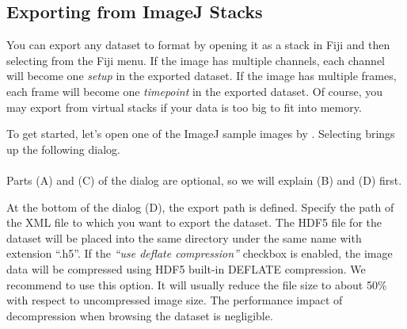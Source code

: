 \documentclass{scrartcl}
\begin{document}
%
\subsection{Exporting from ImageJ Stacks}
You can export any dataset to \bdv format by opening it as a stack in Fiji and then selecting  from the Fiji menu.
If the image has multiple channels, each channel will become one \emph{setup} in the exported dataset.
If the image has multiple frames, each frame will become one \emph{timepoint} in the exported dataset.
Of course, you may export from virtual stacks if your data is too big to fit into memory.

To get started, let's open one of the ImageJ sample images by .
Selecting  brings up the following dialog.
\\
\\
Parts (A) and (C) of the dialog are optional, so we will explain (B) and (D) first.

At the bottom of the dialog (D), the export path is defined.
Specify the path of the XML file to which you want to export the dataset.
The HDF5 file for the dataset will be placed into the same directory under the same name with extension ``.h5''.
If the \emph{``use deflate compression''} checkbox is enabled, the image data will be compressed using HDF5 built-in DEFLATE compression.
We recommend to use this option.
It will usually reduce the file size to about 50\% with respect to uncompressed image size.
The performance impact of decompression when browsing the dataset is negligible.
\end{document}
